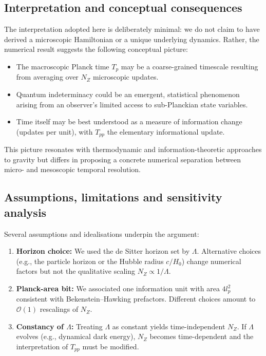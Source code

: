 \documentclass[12pt]{article}
\begin{document}
\subsection{Interpretation and conceptual consequences}
The interpretation adopted here is deliberately minimal: we do not claim to have derived a microscopic Hamiltonian or a unique underlying dynamics. Rather, the numerical result suggests the following conceptual picture:
\begin{itemize}
  \item The macroscopic Planck time $T_p$ may be a coarse-grained timescale resulting from averaging over $N_Z$ microscopic updates.
  \item Quantum indeterminacy could be an emergent, statistical phenomenon arising from an observer's limited access to sub-Planckian state variables.
  \item Time itself may be best understood as a measure of information change (updates per unit), with $T_{pp}$ the elementary informational update.
\end{itemize}
This picture resonates with thermodynamic and information-theoretic approaches to gravity \cite{Jacobson1995,Padmanabhan2010,Verlinde2011} but differs in proposing a concrete numerical separation between micro- and mesoscopic temporal resolution.

\subsection{Assumptions, limitations and sensitivity analysis}
Several assumptions and idealisations underpin the argument:
\begin{enumerate}
  \item \textbf{Horizon choice:} We used the de Sitter horizon set by $\Lambda$. Alternative choices (e.g., the particle horizon or the Hubble radius $c/H_0$) change numerical factors but not the qualitative scaling $N_Z\propto 1/\Lambda$.
  \item \textbf{Planck-area bit:} We associated one information unit with area $4l_p^2$ consistent with Bekenstein–Hawking prefactors. Different choices amount to $\mathcal{O}(1)$ rescalings of $N_Z$.
  \item \textbf{Constancy of $\Lambda$:} Treating $\Lambda$ as constant yields time-independent $N_Z$. If $\Lambda$ evolves (e.g., dynamical dark energy), $N_Z$ becomes time-dependent and the interpretation of $T_{pp}$ must be modified.
\end{enumerate}
\end{document}
